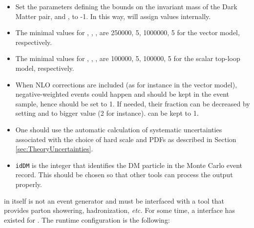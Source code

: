\begin{itemize}
  

\item Set the parameters defining the bounds on the invariant mass of the Dark Matter pair, \masslow and \masshigh, to -1. In this way, \powheg will assign values internally. 
\item The minimal values for \ncallOne, \itmxOne, \ncallTwo, \itmxTwo are 250000, 5, 1000000, 5 for the vector model, respectively.
\item The minimal values for \ncallOne, \itmxOne, \ncallTwo, \itmxTwo are 100000, 5, 100000, 5 for the scalar top-loop model, respectively.
\item When NLO corrections are included (as for instance in the
  vector model), negative-weighted events could happen and should
  be kept in the event sample, hence \withnegweights should be set to
  1. If needed, their fraction can be decreased by setting \foldsci
  and \foldy to bigger value (2 for instance). \foldphi can be kept to
  1.
\item One should use the automatic calculation of systematic uncertainties associated with the choice of hard scale and PDFs as described in Section\,\ref{sec:TheoryUncertainties}.

\item \texttt{idDM} is the integer that identifies the DM particle in the Monte Carlo event record.  This should be chosen so that other tools can process the \powheg output properly.

\end{itemize}


\powheg in itself is not an event generator and must be interfaced with a tool that provides parton showering, hadronization, \textit{etc.}   For some time, a
\pythiaEight \cite{Sjostrand:2014zea} interface
has existed for \powheg.  The \pythiaEight runtime configuration is
the following:

